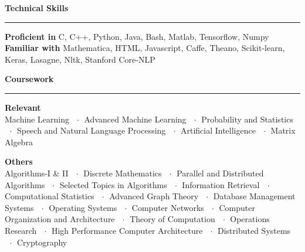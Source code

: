 \documentclass[10pt]{article}
\newcommand{\heading}[1]{
 {\large \textbf{#1}}
  \vspace{0.4em}
  \hrule
  \vspace{0.4em}
}
\newcommand{\EntryGap}{\vspace{0.8em}}
\newcommand{\SmallEntryGap}{\vspace{0.4em}}
\newcommand{\mdot}{$\ \ \cdot\ \ $}
\begin{document}
\EntryGap
\heading{Technical Skills}
\SmallEntryGap
\textbf{Proficient in} C, C++, Python, Java, Bash, Matlab, Tensorflow, Numpy\\
\textbf{Familiar with} Mathematica, HTML, Javascript, Caffe, Theano, Scikit-learn,\\
Keras, Lasagne, Nltk, Stanford Core-NLP



\EntryGap
\heading{Coursework}
\SmallEntryGap
\textbf{Relevant}\\
Machine Learning \mdot Advanced Machine Learning \mdot Probability and Statistics \mdot Speech and Natural Language Processing 
\mdot Artificial Intelligence \mdot Matrix Algebra

\SmallEntryGap
\textbf{Others}\\
Algorithms-I \& II \mdot Discrete Mathematics \mdot Parallel and Distributed Algorithms 
\mdot Selected Topics in Algorithms \mdot Information Retrieval \mdot Computational Statistics
\mdot Advanced Graph Theory \mdot Database Management Systems \mdot Operating Systems
\mdot Computer Networks \mdot Computer Organization and Architecture \mdot Theory of Computation
\mdot Operations Research \mdot High Performance Computer Architecture \mdot Distributed Systems
\mdot Cryptography
\end{document}
